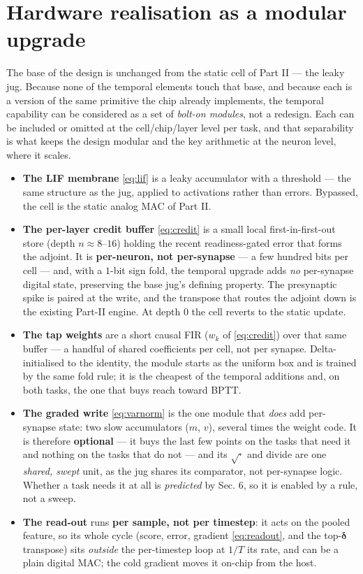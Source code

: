 \documentclass[11pt]{article}
\providecommand{\tightlist}{\setlength{\itemsep}{0pt}\setlength{\parskip}{0pt}}
\begin{document}
\hypertarget{sec:hardware}{%
\section{Hardware realisation as a modular upgrade}\label{sec:hardware}}

The base of the design is unchanged from the static cell of Part II ---
the leaky jug. Because none of the temporal elements touch that base,
and because each is a version of the same primitive the chip already
implements, the temporal capability can be considered as a set of
\emph{bolt-on modules}, not a redesign. Each can be included or omitted
at the cell/chip/layer level per task, and that separability is what
keeps the design modular and the key arithmetic at the neuron level,
where it scales.

\begin{itemize}
\tightlist
\item
  \textbf{The LIF membrane} \eqref{eq:lif} is a leaky accumulator with a
  threshold --- the same structure as the jug, applied to activations
  rather than errors. Bypassed, the cell is the static analog MAC of
  Part II.
\item
  \textbf{The per-layer credit buffer} \eqref{eq:credit} is a small
  local first-in-first-out store (depth \(n\approx8\)--\(16\)) holding
  the recent readiness-gated error that forms the adjoint. It is
  \textbf{per-neuron, not per-synapse} --- a few hundred bits per cell
  --- and, with a \(1\)-bit sign fold, the temporal upgrade adds
  \emph{no} per-synapse digital state, preserving the base jug's
  defining property. The presynaptic spike is paired at the write, and
  the transpose that routes the adjoint down is the existing Part-II
  engine. At depth \(0\) the cell reverts to the static update.
\item
  \textbf{The tap weights} are a short causal FIR (\(w_k\) of
  \eqref{eq:credit}) over that same buffer --- a handful of shared
  coefficients per cell, not per synapse. Delta-initialised to the
  identity, the module starts as the uniform box and is trained by the
  same fold rule; it is the cheapest of the temporal additions and, on
  both tasks, the one that buys reach toward BPTT.
\item
  \textbf{The graded write} \eqref{eq:varnorm} is the one module that
  \emph{does} add per-synapse state: two slow accumulators (\(m\),
  \(v\)), several times the weight code. It is therefore
  \textbf{optional} --- it buys the last few points on the tasks that
  need it and nothing on the tasks that do not --- and its
  \(\sqrt{\cdot}\) and divide are one \emph{shared, swept} unit, as the
  jug shares its comparator, not per-synapse logic. Whether a task needs
  it at all is \emph{predicted} by Sec. 6, so it is enabled by a rule,
  not a sweep.
\item
  \textbf{The read-out} runs \textbf{per sample, not per timestep}: it
  acts on the pooled feature, so its whole cycle (score, error, gradient
  \eqref{eq:readout}, and the top-\(\bm\delta\) transpose) sits
  \emph{outside} the per-timestep loop at \(1/T\) its rate, and can be a
  plain digital MAC; the cold gradient moves it on-chip from the host.
\end{itemize}
\end{document}
